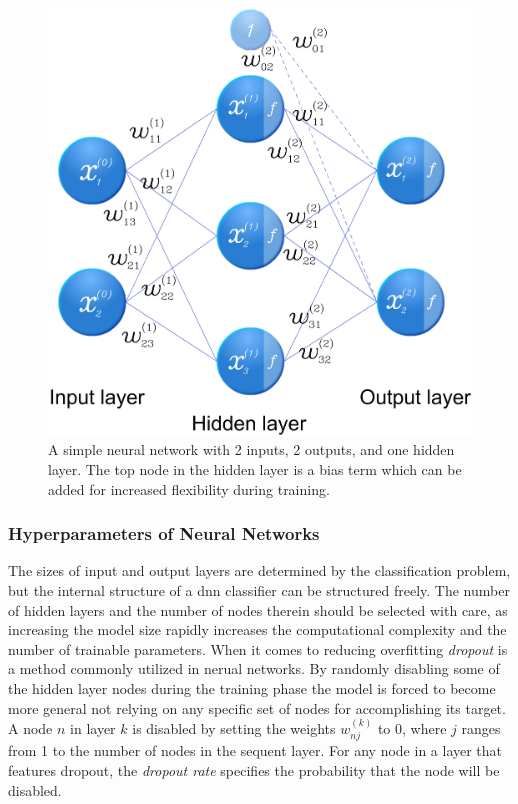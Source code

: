 \begin{figure}[h]
	\centering
	\includegraphics[scale=0.3]{figs_temp/network_graph.jpg}
	\caption{A simple neural network with 2 inputs, 2 outputs, and one hidden layer. The top node in the hidden layer is a bias term which can be added for increased flexibility during training.}
	\label{fig:ann}
\end{figure}

\subsubsection{Hyperparameters of Neural Networks}

The sizes of input and output layers are determined by the classification problem, but the internal structure of a \gls{dnn} classifier can be structured freely. The number of hidden layers and the number of nodes therein should be selected with care, as increasing the model size rapidly increases the computational complexity and the number of trainable parameters. When it comes to reducing overfitting \emph{dropout} is a method commonly utilized in nerual networks. By randomly disabling some of the hidden layer nodes during the training phase the model is forced to become more general not relying on any specific set of nodes for accomplishing its target. A node $n$ in layer $k$ is disabled by setting the weights $w^{(k)}_{nj}$ to 0, where $j$ ranges from 1 to the number of nodes in the sequent layer. For any node in a layer that features dropout, the \textit{dropout rate} specifies the probability that the node will be disabled.

